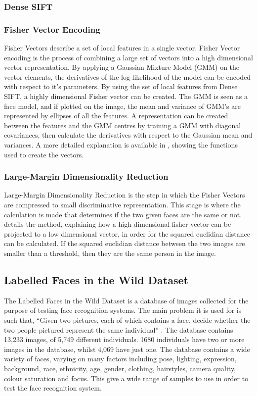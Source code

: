\documentclass[12pt, a4paper]{article}
\begin{document}
\subsubsection{Dense SIFT}


\subsubsection{Fisher Vector Encoding}
Fisher Vectors describe a set of local features in a single vector. Fisher Vector encoding is the process of combining a large set of vectors into a high dimensional vector representation. By applying a Gaussian Mixture Model (GMM) on the vector elements, the derivatives of the log-likelihood of the model can be encoded with respect to it’s parameters. By using the set of local features from Dense SIFT, a highly dimensional Fisher vector can be created. The GMM is seen as a face model, and if plotted on the image, the mean and variance of GMM’s are represented by ellipses of all the features. A representation can be created between the features and the GMM centres by training a GMM with diagonal covariances, then calculate the derivatives with respect to the Gaussian mean and variances. A more detailed explanation is available in \cite{simonyan2004fisher}, showing the functions used to create the vectors.

\subsubsection{Large-Margin Dimensionality Reduction}

Large-Margin Dimensionality Reduction is the step in which the Fisher Vectors are compressed to small discriminative representation. This stage is where the calculation is made that determines if the two given faces are the same or not. \cite{simonyan2004fisher} details the method, explaining how a high dimensional fisher vector can be projected to a low dimensional vector, in order for the squared euclidian distance can be calculated. If the squared euclidian distance between the two images are smaller than a threshold, then they are the same person in the image.
        
  \subsection{Labelled Faces in the Wild Dataset}

The Labelled Faces in the Wild Dataset is a database of images collected for the purpose of testing face recognition systems. The main problem it is used for is such that, “Given two pictures, each of which contains a face, decide whether the two people pictured represent the same individual” \cite{labelledFaces}. The database contains 13,233 images, of 5,749 different individuals. 1680 individuals have two or more images in the database, whilst 4,069 have just one. The database contains a wide variety of faces, varying on many factors including pose, lighting, expression, background, race, ethnicity, age, gender, clothing, hairstyles, camera quality, colour saturation and focus. This give a wide range of samples to use in order to test the face recognition system.
\end{document}

